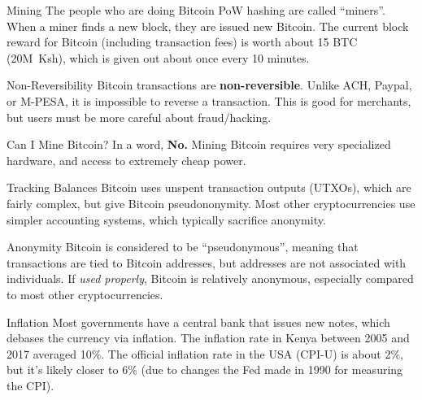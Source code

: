 \documentclass[14pt]{beamer}
\begin{document}
\begin{frame}{Mining}
  The people who are doing Bitcoin PoW hashing are called ``miners''. When a
  miner finds a new block, they are issued new Bitcoin.
  \newline
  \newline
  The current block reward for Bitcoin (including transaction fees) is worth
  about 15 BTC (20M~Ksh), which is given out about once every 10 minutes.
\end{frame}

\begin{frame}{Non-Reversibility}
  Bitcoin transactions are \textbf{non-reversible}.
  \newline
  \newline
  Unlike ACH, Paypal, or M-PESA, it is impossible to reverse a transaction.
  \newline
  \newline
  This is good for merchants, but users must be more careful about
  fraud/hacking.
\end{frame}

\begin{frame}{Can I Mine Bitcoin?}
  In a word, \textbf{No.}
  \newline
  \newline
  Mining Bitcoin requires very specialized hardware, and access to extremely
  cheap power.
\end{frame}

\begin{frame}{Tracking Balances}
  Bitcoin uses unspent transaction outputs (UTXOs), which are fairly complex,
  but give Bitcoin pseudononymity.
  \newline
  \newline
  Most other cryptocurrencies use simpler accounting systems, which typically
  sacrifice anonymity.
\end{frame}

\begin{frame}{Anonymity}
  Bitcoin is considered to be ``pseudonymous'', meaning that transactions are
  tied to Bitcoin addresses, but addresses are not associated with individuals.
  \newline
  \newline
  If \emph{used properly}, Bitcoin is relatively anonymous, especially compared
  to most other cryptocurrencies.
\end{frame}

\begin{frame}{Inflation}
  Most governments have a central bank that issues new notes, which debases the
  currency via inflation.
  \newline
  \newline
  The inflation rate in Kenya between 2005 and 2017 averaged 10\%.
  \newline
  \newline
  The official inflation rate in the USA (CPI-U) is about 2\%, but it's likely
  closer to 6\% (due to changes the Fed made in 1990 for measuring the CPI).
\end{frame}
\end{document}
